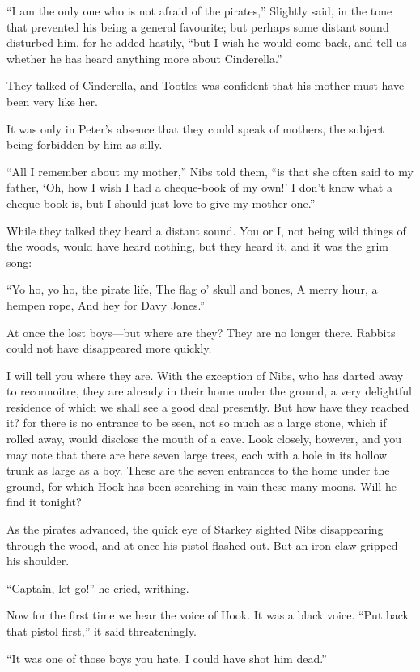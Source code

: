 ``I am the only one who is not afraid of the pirates,'' Slightly said, in
the tone that prevented his being a general favourite; but perhaps some
distant sound disturbed him, for he added hastily, ``but I wish he would
come back, and tell us whether he has heard anything more about
Cinderella.''

They talked of Cinderella, and Tootles was confident that his mother
must have been very like her.

It was only in Peter's absence that they could speak of mothers, the
subject being forbidden by him as silly.

``All I remember about my mother,'' Nibs told them, ``is that she often
said to my father, ‘Oh, how I wish I had a cheque-book of my own!' I
don't know what a cheque-book is, but I should just love to give my
mother one.''

While they talked they heard a distant sound. You or I, not being wild
things of the woods, would have heard nothing, but they heard it, and
it was the grim song:

``Yo ho, yo ho, the pirate life,
    The flag o' skull and bones,
A merry hour, a hempen rope,
    And hey for Davy Jones.''

At once the lost boys—but where are they? They are no longer there.
Rabbits could not have disappeared more quickly.

I will tell you where they are. With the exception of Nibs, who has
darted away to reconnoitre, they are already in their home under the
ground, a very delightful residence of which we shall see a good deal
presently. But how have they reached it? for there is no entrance to be
seen, not so much as a large stone, which if rolled away, would
disclose the mouth of a cave. Look closely, however, and you may note
that there are here seven large trees, each with a hole in its hollow
trunk as large as a boy. These are the seven entrances to the home
under the ground, for which Hook has been searching in vain these many
moons. Will he find it tonight?

As the pirates advanced, the quick eye of Starkey sighted Nibs
disappearing through the wood, and at once his pistol flashed out. But
an iron claw gripped his shoulder.

``Captain, let go!'' he cried, writhing.

Now for the first time we hear the voice of Hook. It was a black voice.
``Put back that pistol first,'' it said threateningly.

``It was one of those boys you hate. I could have shot him dead.''

